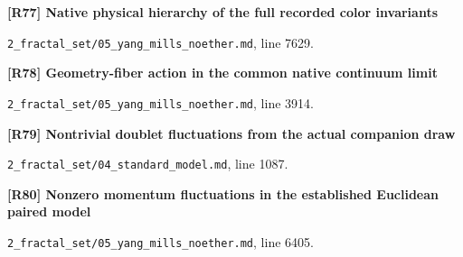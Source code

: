 \documentclass[11pt,a4paper]{article}
\begin{document}
\par\medskip\noindent\begin{minipage}{\linewidth}\textbf{[R77] Native physical hierarchy of the full recorded color invariants}\label{src:thm-ym-native-physical-gauge-hierarchy}\par
{\small\texttt{}\par
\nolinkurl{2_fractal_set/05_yang_mills_noether.md}, line 7629.\par}
\end{minipage}\par

\par\medskip\noindent\begin{minipage}{\linewidth}\textbf{[R78] Geometry-fiber action in the common native continuum limit}\label{src:thm-ym-native-fiber-continuum}\par
{\small\texttt{}\par
\nolinkurl{2_fractal_set/05_yang_mills_noether.md}, line 3914.\par}
\end{minipage}\par

\par\medskip\noindent\begin{minipage}{\linewidth}\textbf{[R79] Nontrivial doublet fluctuations from the actual companion draw}\label{src:thm-sm-native-doublet-fluctuations}\par
{\small\texttt{}\par
\nolinkurl{2_fractal_set/04_standard_model.md}, line 1087.\par}
\end{minipage}\par

\par\medskip\noindent\begin{minipage}{\linewidth}\textbf{[R80] Nonzero momentum fluctuations in the established Euclidean paired model}\label{src:cor-ym-paired-momentum-fluctuations}\par
{\small\texttt{}\par
\nolinkurl{2_fractal_set/05_yang_mills_noether.md}, line 6405.\par}
\end{minipage}\par
\end{document}
